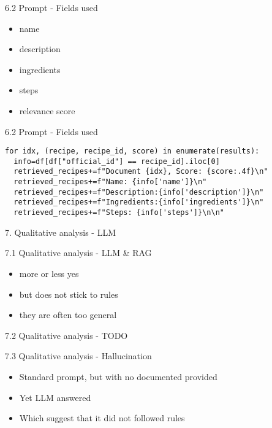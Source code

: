 \documentclass{beamer}
\begin{document}
\begin{frame}{6.2 Prompt - Fields used}
  \begin{itemize}
    \item name
    \item description
    \item ingredients
    \item steps
    \item relevance score
  \end{itemize}
\end{frame}

\begin{frame}[fragile]{6.2 Prompt - Fields used}
\begin{verbatim}
for idx, (recipe, recipe_id, score) in enumerate(results):
  info=df[df["official_id"] == recipe_id].iloc[0]
  retrieved_recipes+=f"Document {idx}, Score: {score:.4f}\n"
  retrieved_recipes+=f"Name: {info['name']}\n"
  retrieved_recipes+=f"Description:{info['description']}\n"
  retrieved_recipes+=f"Ingredients:{info['ingredients']}\n"
  retrieved_recipes+=f"Steps: {info['steps']}\n\n"
\end{verbatim}
\end{frame}

\begin{frame}{7. Qualitative analysis - LLM}
\end{frame}

\begin{frame}{7.1 Qualitative analysis - LLM \& RAG}
  \begin{itemize}
    \item more or less yes
    \item but does not stick to rules
    \item they are often too general
  \end{itemize}
\end{frame}

\begin{frame}{7.2 Qualitative analysis - TODO}
\end{frame}

\begin{frame}{7.3 Qualitative analysis - Hallucination}
  \begin{itemize}
    \item Standard prompt, but with no documented provided
    \item Yet LLM answered
    \item Which suggest that it did not followed rules
  \end{itemize}
\end{frame}
\end{document}
